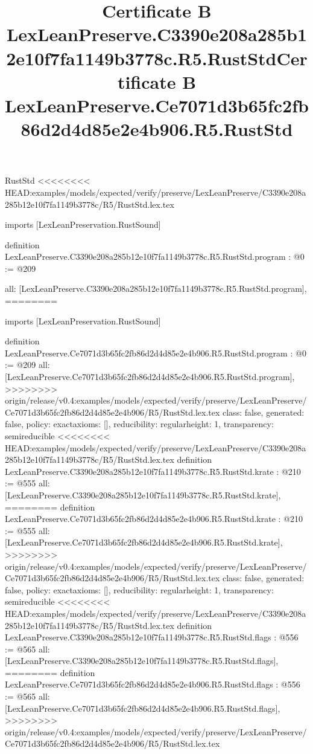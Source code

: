 \begin{lexlean}{RustStd}
<<<<<<<< HEAD:examples/models/expected/verify/preserve/LexLeanPreserve/C3390e208a285b12e10f7fa1149b3778c/R5/RustStd.lex.tex
\title{Certificate B LexLeanPreserve.C3390e208a285b12e10f7fa1149b3778c.R5.RustStd}
\begin{coremodule}
imports [LexLeanPreservation.RustSound]

definition LexLeanPreserve.C3390e208a285b12e10f7fa1149b3778c.R5.RustStd.program : @0 := @209 {
  all: [LexLeanPreserve.C3390e208a285b12e10f7fa1149b3778c.R5.RustStd.program],
========
\title{Certificate B LexLeanPreserve.Ce7071d3b65fc2fb86d2d4d85e2e4b906.R5.RustStd}
\begin{coremodule}
imports [LexLeanPreservation.RustSound]

definition LexLeanPreserve.Ce7071d3b65fc2fb86d2d4d85e2e4b906.R5.RustStd.program : @0 := @209 {
  all: [LexLeanPreserve.Ce7071d3b65fc2fb86d2d4d85e2e4b906.R5.RustStd.program],
>>>>>>>> origin/release/v0.4:examples/models/expected/verify/preserve/LexLeanPreserve/Ce7071d3b65fc2fb86d2d4d85e2e4b906/R5/RustStd.lex.tex
  class: false,
  generated: false,
  policy: exact{axioms: []},
  reducibility: regular{height: 1},
  transparency: semireducible
}
<<<<<<<< HEAD:examples/models/expected/verify/preserve/LexLeanPreserve/C3390e208a285b12e10f7fa1149b3778c/R5/RustStd.lex.tex
definition LexLeanPreserve.C3390e208a285b12e10f7fa1149b3778c.R5.RustStd.krate : @210 := @555 {
  all: [LexLeanPreserve.C3390e208a285b12e10f7fa1149b3778c.R5.RustStd.krate],
========
definition LexLeanPreserve.Ce7071d3b65fc2fb86d2d4d85e2e4b906.R5.RustStd.krate : @210 := @555 {
  all: [LexLeanPreserve.Ce7071d3b65fc2fb86d2d4d85e2e4b906.R5.RustStd.krate],
>>>>>>>> origin/release/v0.4:examples/models/expected/verify/preserve/LexLeanPreserve/Ce7071d3b65fc2fb86d2d4d85e2e4b906/R5/RustStd.lex.tex
  class: false,
  generated: false,
  policy: exact{axioms: []},
  reducibility: regular{height: 1},
  transparency: semireducible
}
<<<<<<<< HEAD:examples/models/expected/verify/preserve/LexLeanPreserve/C3390e208a285b12e10f7fa1149b3778c/R5/RustStd.lex.tex
definition LexLeanPreserve.C3390e208a285b12e10f7fa1149b3778c.R5.RustStd.flags : @556 := @565 {
  all: [LexLeanPreserve.C3390e208a285b12e10f7fa1149b3778c.R5.RustStd.flags],
========
definition LexLeanPreserve.Ce7071d3b65fc2fb86d2d4d85e2e4b906.R5.RustStd.flags : @556 := @565 {
  all: [LexLeanPreserve.Ce7071d3b65fc2fb86d2d4d85e2e4b906.R5.RustStd.flags],
>>>>>>>> origin/release/v0.4:examples/models/expected/verify/preserve/LexLeanPreserve/Ce7071d3b65fc2fb86d2d4d85e2e4b906/R5/RustStd.lex.tex
}}}
\end{coremodule}}
\end{coremodule}
\end{lexlean}
